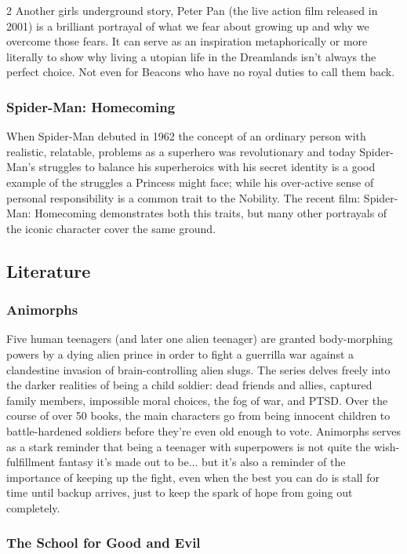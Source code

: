 \begin{multicols}{2}
Another girls underground story, Peter Pan (the live action film released in 2001) is a brilliant portrayal of what we fear about growing up and why we overcome those fears. It can serve as an inspiration metaphorically or more literally to show why living a utopian life in the Dreamlands isn't always the perfect choice. Not even for Beacons who have no royal duties to call them back. 

\subsubsection*{Spider-Man: Homecoming}

When Spider-Man debuted in 1962 the concept of an ordinary person with realistic, relatable, problems as a superhero was revolutionary and today Spider-Man's struggles to balance his superheroics with his secret identity is a good example of the struggles a Princess might face; while his over-active sense of personal responsibility is a common trait to the Nobility. The recent film: Spider-Man: Homecoming demonstrates both this traits, but many other portrayals of the iconic character cover the same ground. 

\subsection*{Literature}

\subsubsection*{Animorphs}

Five human teenagers (and later one alien teenager) are granted body-morphing powers by a dying alien prince in order to fight a guerrilla war against a clandestine invasion of brain-controlling alien slugs. The series delves freely into the darker realities of being a child soldier: dead friends and allies, captured family members, impossible moral choices, the fog of war, and PTSD. Over the course of over 50 books, the main characters go from being innocent children to battle-hardened soldiers before they're even old enough to vote. Animorphs serves as a stark reminder that being a teenager with superpowers is not quite the wish-fulfillment fantasy it's made out to be... but it's also a reminder of the importance of keeping up the fight, even when the best you can do is stall for time until backup arrives, just to keep the spark of hope from going out completely.

\subsubsection*{The School for Good and Evil}


\end{multicols}
